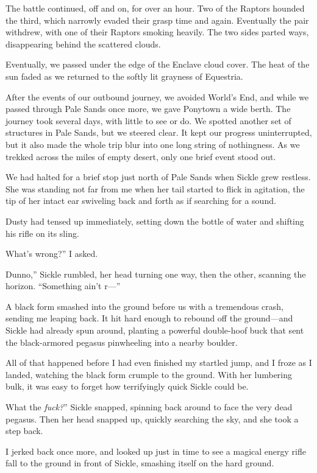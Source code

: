 The battle continued, off and on, for over an hour. Two of the Raptors hounded the third, which narrowly evaded their grasp time and again. Eventually the pair withdrew, with one of their Raptors smoking heavily. The two sides parted ways, disappearing behind the scattered clouds.

Eventually, we passed under the edge of the Enclave cloud cover. The heat of the sun faded as we returned to the softly lit grayness of Equestria.

After the events of our outbound journey, we avoided World’s End, and while we passed through Pale Sands once more, we gave Ponytown a wide berth. The journey took several days, with little to see or do. We spotted another set of structures in Pale Sands, but we steered clear. It kept our progress uninterrupted, but it also made the whole trip blur into one long string of nothingness. As we trekked across the miles of empty desert, only one brief event stood out.

{\br}%
We had halted for a brief stop just north of Pale Sands when Sickle grew restless. She was standing not far from me when her tail started to flick in agitation, the tip of her intact ear swiveling back and forth as if searching for a sound.

Dusty had tensed up immediately, setting down the bottle of water and shifting his rifle on its sling.

\leavevmode{}What’s wrong?” I asked.

\leavevmode{}Dunno,” Sickle rumbled, her head turning one way, then the other, scanning the horizon. “Something ain’t r—”

A black form smashed into the ground before us with a tremendous crash, sending me leaping back. It hit hard enough to rebound off the ground—and Sickle had already spun around, planting a powerful double-hoof buck that sent the black-armored pegasus pinwheeling into a nearby boulder.

All of that happened before I had even finished my startled jump, and I froze as I landed, watching the black form crumple to the ground. With her lumbering bulk, it was easy to forget how terrifyingly quick Sickle could be.

\leavevmode{}What the \textit{fuck?}” Sickle snapped, spinning back around to face the very dead pegasus. Then her head snapped up, quickly searching the sky, and she took a step back.

I jerked back once more, and looked up just in time to see a magical energy rifle fall to the ground in front of Sickle, smashing itself on the hard ground.

